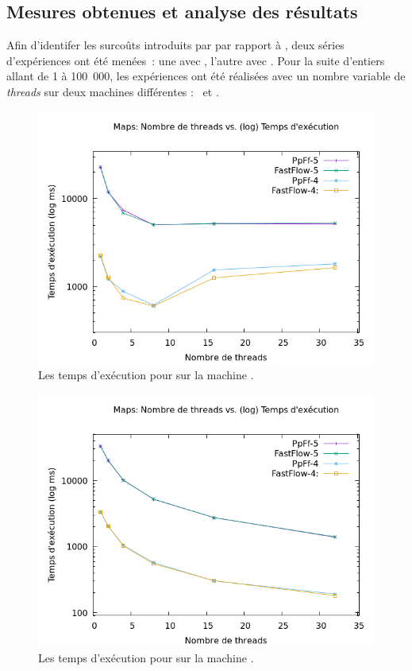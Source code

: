 \subsection{Mesures obtenues et analyse des r\'esultats}

Afin d'identifer les surco\^uts introduits par \PpFf{} par rapport \`a , deux s\'eries d'exp\'eriences ont \'et\'e men\'ees~: une avec , l'autre avec . Pour la suite d'entiers allant de 1 \`a 100~000, les exp\'eriences ont \'et\'e r\'ealis\'ees avec un nombre variable de \emph{threads} sur deux machines diff\'erentes : \ et .  


\begin{figure}
\centering
     \includegraphics[width=1.0\textwidth]{Figures/graphe_temps_Java_Maps.png}
      \caption{Les temps d'ex\'ecution pour  sur la machine .}
       \label{GrapheTempsMapsJava.fig}
\end{figure}

\begin{figure}
\centering
     \includegraphics[width=1.0\textwidth]{Figures/graphe_temps_Japet_Maps.png}
      \caption{Les temps d'ex\'ecution pour  sur la machine .}
       \label{GrapheTempsMapstJapet.fig}
\end{figure}


